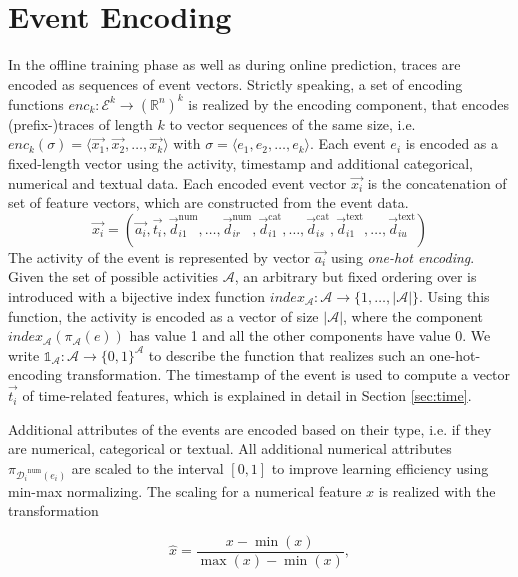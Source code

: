 \section{Event Encoding}

In the offline training phase as well as during online prediction, traces are encoded as sequences of event vectors.
Strictly speaking, a set of encoding functions  $enc_k \colon \mathcal{E}^k \to (\mathbb{R}^n)^k$ is realized by the encoding component, that encodes (prefix-)traces of length $k$ to vector sequences of the same size, i.e. $enc_k(\sigma) = \langle \vec{x_1}, \vec{x_2}, \dots, \vec{x_k}\rangle$ with $\sigma = \langle e_1, e_2, \dots, e_k\rangle$.
Each event $e_i$ is encoded as a fixed-length vector using the activity, timestamp and additional categorical, numerical and textual data.
Each encoded event vector $\vec{x_i}$ is the concatenation of set of feature vectors, which are constructed from the event data.
\begin{equation*}
\vec{x_i}=(
\vec{a_i},
\vec{t_i},
\vec{d}_{i1}^\mathrm{num}, \dots,\vec{d}_{ir}^\mathrm{num},
\vec{d}_{i1}^\mathrm{cat}, \dots,\vec{d}_{is}^\mathrm{cat},
\vec{d}_{i1}^\mathrm{text}, \dots, \vec{d}_{iu}^\mathrm{text})
\end{equation*}
The activity of the event is represented by vector $\vec{a_i}$ using \textit{one-hot encoding}.
Given the set of possible activities $\mathcal{A}$, an arbitrary but fixed ordering over is introduced with a bijective index function $index_\mathcal{A} \colon \mathcal{A} \to \{1, \dots, |\mathcal{A}|\}$.
Using this function, the activity is encoded as a vector of size $|\mathcal{A}|$, where the component $index_\mathcal{A}(\pi_\mathcal{A}(e))$ has value 1 and all the other components have value 0.
We write $\mathds{1}_\mathcal{A}\colon \mathcal{A} \to \{0,1\}^\mathcal{A}$ to describe the function that realizes such an one-hot-encoding transformation.
The timestamp of the event is used to compute a vector $\vec{t_i}$ of time-related features, which is explained in detail in Section \ref*{sec:time}.

Additional attributes of the events are encoded based on their type, i.e. if they are numerical, categorical or textual.
All additional numerical attributes $\pi_{{\mathcal{D}_i}^\mathrm{num}(e_i)}$ are scaled to the interval $ [0, 1]$ to improve learning efficiency using min-max normalizing.
The scaling for a numerical feature $x$ is realized with the transformation

$$\hat{x} = \dfrac{x-\min(x)}{\max(x) - \min(x)},$$


